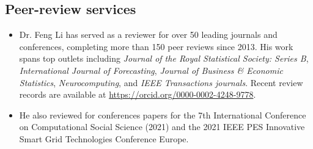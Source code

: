 \documentclass[twoside,a4paper]{article}
\begin{document}
\begin{refsection}
\printbibliography[heading=none]

\section{Peer-review services}

\begin{itemize}

\item Dr. Feng Li has served as a reviewer for over 50 leading journals and conferences, completing more than 150 peer reviews since 2013. His work spans top outlets including \emph{Journal of the Royal Statistical Society: Series B}, \emph{International Journal of Forecasting}, \emph{Journal of Business \& Economic Statistics}, \emph{Neurocomputing}, and \emph{IEEE Transactions journals}. Recent review records are available at \url{https://orcid.org/0000-0002-4248-9778}.

\item He also reviewed for conferences papers for the 7th International Conference on Computational Social Science (2021) and the 2021 IEEE PES Innovative Smart Grid Technologies Conference Europe.


\end{itemize}
\end{refsection}
\end{document}

